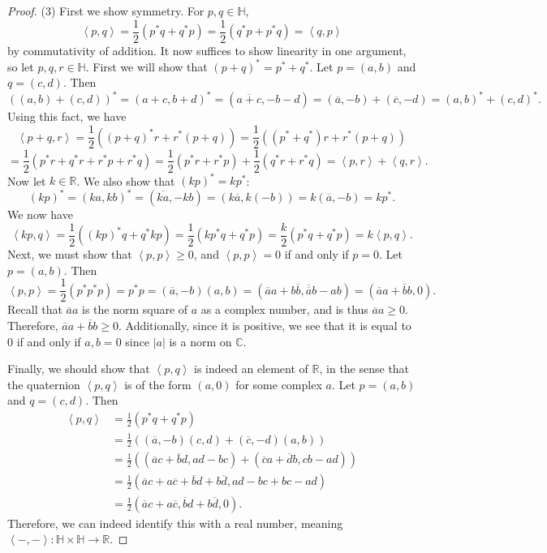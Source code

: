 \documentclass[11pt, letterpaper]{article}
\theoremstyle{plain}
\begin{document}
\begin{proof}
	(3) First we show symmetry. For $p,q\in\mathbb{H} $,
	\[
		\left\langle p,q \right\rangle =\frac{1}{2} \left( p^*q+q^*p \right) =\frac{1}{2} \left( q^*p+p^*q \right) =\left\langle q,p \right\rangle 
	\]
	by commutativity of addition. It now suffices to show linearity in one argument, so let $p,q,r\in\mathbb{H} $. First we will show that $(p+q)^*=p^*+q^*$. Let $p=(a,b)$ and $q=(c,d)$. Then
	\[
		\left( (a,b)+(c,d) \right) ^*=(a+c,b+d)^*=\left( \overline{a+c} ,-b-d \right) =\left( \overline{a} ,-b \right) +\left( \overline{c} ,-d \right) =(a,b)^*+(c,d)^*
	.\]
	Using this fact, we have
	\[
		\left\langle p+q,r \right\rangle =\frac{1}{2} \left( (p+q)^*r + r^*(p+q) \right) =\frac{1}{2} \left( \left( p^*+q^* \right) r+r^*\left( p+q \right)  \right) 
	\]
	\[
		=\frac{1}{2} \left( p^*r+q^*r+r^*p+r^*q \right) =\frac{1}{2} \left( p^*r+r^*p \right) +\frac{1}{2} \left( q^*r+r^*q \right) =\left\langle p,r \right\rangle +\left\langle q,r \right\rangle 
	.\]
	Now let $k\in\mathbb{R} $. We also show that $(kp)^*=kp^*$:
	\[
		(kp)^*=(ka,kb)^*=( \overline{ka} ,-kb)=(k \overline{a} ,k(-b))=k(\overline{a} ,-b)=kp^*
	.\]
	We now have
	\[
		\left\langle kp,q \right\rangle =\frac{1}{2} \left( (kp)^*q+q^*kp \right) =\frac{1}{2} \left( kp^*q+q^*p \right) =\frac{k}{2} \left( p^*q+q^*p \right) =k\left\langle p,q \right\rangle 
	.\]
	Next, we must show that $\left\langle p,p \right\rangle \geq 0$, and $\left\langle p,p \right\rangle =0$ if and only if $p=0$. Let $p=(a,b)$. Then
	\[
		\left\langle p,p \right\rangle =\frac{1}{2} \left( p^*p^*p \right) =p^*p=(\overline{a} ,-b)(a,b)=( \overline{a} a+b \overline{b}, \overline{\overline{a} } b-ab)=\left( \overline{a} a+\overline{b} b,0 \right) 
	.\]
	Recall that $\overline{a} a$ is the norm square of $a$ as a complex number, and is thus $\overline{a} a \geq 0$. Therefore, $\overline{a} a+\overline{b} b\geq 0$. Additionally, since it is positive, we see that it is equal to 0 if and only if $a,b=0$ since $\left| a \right| $ is a norm on $\mathbb{C} $.
	
	Finally, we should show that $\left\langle p,q \right\rangle $ is indeed an element of $\mathbb{R} $, in the sense that the quaternion $\left\langle p,q \right\rangle $ is of the form $(a,0)$ for some complex $a$. Let $p=(a,b)$ and $q=(c,d)$. Then
	\begin{align*}
		\left\langle p,q \right\rangle &=\frac{1}{2} \left( p^*q+q^*p \right) \\
					       &=\frac{1}{2} \left( (\overline{a} ,-b)(c,d)+(\overline{c} ,-d)(a,b) \right) \\
					       &=\frac{1}{2} \left( \left( \overline{a} c+ \overline{b} d,ad-bc \right) +\left( \overline{c} a+ \overline{d} b,cb-ad \right)  \right) \\
					       &=\frac{1}{2} \left( \overline{a} c+ a \overline{c} +\overline{b} d+ b \overline{d} , ad-bc+bc-ad \right) \\
					       &=\frac{1}{2} \left( \overline{a} c+ a \overline{c} , \overline{b} d+b \overline{d} ,0 \right) 
	.\end{align*}
	Therefore, we can indeed identify this with a real number, meaning $\left\langle -,- \right\rangle : \mathbb{H} \times \mathbb{H}  \to \mathbb{R} $.


\end{proof}
\end{document}
